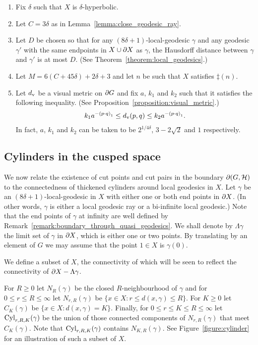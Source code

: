 \begin{enumerate}
  \item Fix $\delta$ such that $X$ is $\delta$-hyperbolic.
  \item Let $C = 3\delta$ as in Lemma~\ref{lemma:close_geodesic_ray}.
  \item Let $D$ be chosen so that for any $(8\delta + 1)$-local-geodesic $\gamma$ and any geodesic $\gamma'$ with the same endpoints in $X \union \boundary X$ as $\gamma$, the Hausdorff distance between $\gamma$ and $\gamma'$ is at most $D$. (See Theorem~\ref{theorem:local_geodesics}.)
  \item Let $M = 6(C + 45\delta) + 2\delta + 3$ and let $n$ be such that $X$ satisfies $\ddag(n)$.
  \item Let $d_\rmv$ be a visual metric on $\boundary G$ and fix $a$, $k_1$ and $k_2$ such that it satisfies the following inequality. (See Proposition~\ref{proposition:visual_metric}.)
    \begin{align}
    k_1 a^{-\gromprod[1]{p}{q}} \leq d_\rmv(p, q) \leq k_2 a^{-\gromprod[1]{p}{q}}.
    \end{align}
    In fact, $a$, $k_1$ and $k_2$ can be taken to be $2^{1/4\delta}$, $3-2\sqrt{2}$ and $1$ respectively.
\end{enumerate}

\subsection{Cylinders in the cusped space}\label{section:cylinders_and_the_boundary} 

We now relate the existence of cut points and cut pairs in the boundary $\boundary(G, \calH)$ to the connectedness of thickened cylinders around local geodesics in $X$.
Let $\gamma$ be an $(8\delta+1)$-local-geodesic in $X$ with either one or both end points in $\boundary X$. 
(In other words, $\gamma$ is either a local geodesic ray or a bi-infinite local geodesic.)
Note that the end points of $\gamma$ at infinity are well defined by Remark~\ref{remark:boundary_through_quasi_geodesics}.
We shall denote by $\Lambda\gamma$ the limit set of $\gamma$ in $\boundary X$, which is either one or two points.
By translating by an element of $G$ we may assume that the point $1 \in X$ is $\gamma(0)$.

We define a subset of $X$, the connectivity of which will be seen to reflect the connectivity of $\boundary X - \Lambda \gamma$. 

\begin{definition}
  For $R \geq 0$ let $N_R(\gamma)$ be the closed $R$-neighbourhood of $\gamma$ and for $0 \leq r \leq R \leq \infty$ let $N_{r, R}(\gamma)$ be $\{x \in X \colon r \leq d(x, \gamma) \leq R\}$. 
  For $K \geq 0$ let $C_K(\gamma)$ be $\{x \in X \colon d(x, \gamma) = K\}$. 
  Finally, for $0 \leq r \leq K \leq R \leq \infty$ let $\Cyl_{r, R, K}(\gamma)$ be the union of those connected components of $N_{r, R}(\gamma)$ that meet $C_K(\gamma)$. 
  Note that $\Cyl_{r, R, K}(\gamma)$ contains $N_{K, R}(\gamma)$.
  See Figure~\ref{figure:cylinder} for an illustration of such a subset of $X$.
\end{definition}

